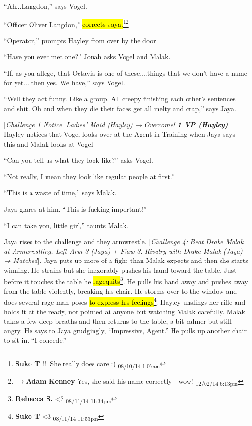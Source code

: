 ``Ah...Langdon,'' says Vogel.

``Officer Oliver Langdon,'' \hl{corrects Jaya.}\footnote{\textbf{Suko T }!!!  She really does care :) \textsubscript{08/10/14 1:07am}}\footnote{$\rightarrow$\textbf{Adam Kenney }Yes, she said his name correctly - wow! \textsubscript{12/02/14 6:13pm}}

``Operator,'' prompts Hayley from over by the door.

``Have you ever met one?'' Jonah asks Vogel and Malak.

``If, as you allege, that Octavia is one of these....things that we don't have a name for yet... then yes.  We have,'' says Vogel.

``Well they act funny.  Like a group.   All creepy finishing each other's sentences and shit.  Oh and when they die their faces get all melty and crap,'' says Jaya.

{[}\textit{Challenge 1 Notice.  Ladies' Maid (Hayley) → Overcome! }\textit{\textbf{1 VP (Hayley)}}{]}  Hayley notices that Vogel looks over at the Agent in Training when Jaya says this and Malak looks at Vogel.

``Can you tell us what they look like?'' asks Vogel.

``Not really, I mean they look like regular people at first.''

``This is a waste of time,'' says Malak.

Jaya glares at him.  ``This is fucking important!''

``I can take you, little girl,'' taunts Malak.



Jaya rises to the challenge and they armwrestle.  {[}\textit{Challenge 4: Beat Drake Malak at Armwrestling.  Left Arm 3 (Jaya) + Flaw 3: Rivalry with Drake Malak (Jaya) → Matched}{]}.  Jaya puts up more of a fight than Malak expects and then she starts winning. He strains but she inexorably pushes his hand toward the table. Just before it touches the table he \hl{ragequits}\footnote{\textbf{Rebecca S. }\textless 3 \textsubscript{08/11/14 11:34pm}}.  He pulls his hand away and pushes away from the table violently, breaking his chair.  He storms over to the window and does several rage man poses \hl{to express his feelings}\footnote{\textbf{Suko T }\textless 3 \textsubscript{08/11/14 11:53pm}}.  Hayley unslings her rifle and holds it at the ready, not pointed at anyone but watching Malak carefully.  Malak takes a few deep breaths and then returns to the table, a bit calmer but still angry.  He says to Jaya grudgingly, ``Impressive, Agent.''  He pulls up another chair to sit in.   ``I concede.''

